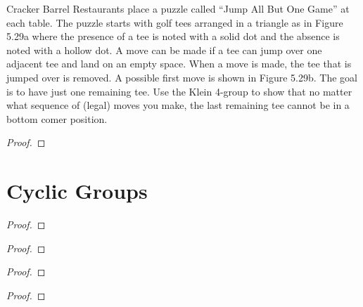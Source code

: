 \begin{exercise}
    Cracker Barrel Restaurants place a puzzle called ``Jump All But One Game'' at each table. The puzzle starts with golf tees arranged in a triangle as in Figure 5.29a where the presence of a tee is noted with a solid dot and the absence is noted with a hollow dot. A move can be made if a tee can jump over one adjacent tee and land on an empty space. When a move is made, the tee that is jumped over is removed. A possible first move is shown in Figure 5.29b. The goal is to have just one remaining tee. Use the Klein 4-group to show that no matter what sequence of (legal) moves you make, the last remaining tee cannot be in a bottom comer position.
\end{exercise}

\begin{proof}
\end{proof}

\section{Cyclic Groups}

\begin{exercise}
\end{exercise}

\begin{proof}
\end{proof}

\begin{exercise}
\end{exercise}

\begin{proof}
\end{proof}

\begin{exercise}
\end{exercise}

\begin{proof}
\end{proof}

\begin{exercise}
\end{exercise}

\begin{proof}
\end{proof}

\begin{exercise}
\end{exercise}

